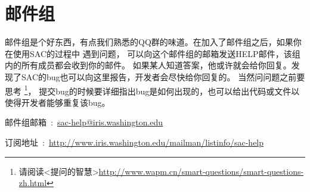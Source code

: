 \section{邮件组}
邮件组是个好东西，有点我们熟悉的QQ群的味道。在加入了邮件组之后，如果你在使用SAC的过程中
遇到问题，
可以向这个邮件组的邮箱发送HELP邮件，该组内的所有成员都会收到你的邮件。
如果某人知道答案，他或许就会给你回复。发现了SAC的bug也可以向这里报告，开发者会尽快给你回复的。
当然问问题之前要思考
\footnote{请阅读<提问的智慧>\url{http://www.wapm.cn/smart-questions/smart-questions-zh.html}}，
提交bug的时候要详细指出bug是如何出现的，也可以给出代码或文件以使得开发者能够重复该bug。

邮件组邮箱~:~\url{sac-help@iris.washington.edu}

订阅地址~:~\small{\url{http://www.iris.washington.edu/mailman/listinfo/sac-help}}
